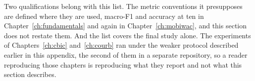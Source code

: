Two qualifications belong with this list. The metric conventions it presupposes are
defined where they are used, macro-F1 and accuracy at ten in
Chapter~\ref{ch:fundamentals} and again in Chapter~\ref{ch:mobiwac}, and this section
does not restate them. And the list covers the final study alone. The experiments of
Chapters~\ref{ch:cbic} and~\ref{ch:courb} ran under the weaker protocol described
earlier in this appendix, the second of them in a separate repository, so a reader
reproducing those chapters is reproducing what they report and not what this section
describes.

